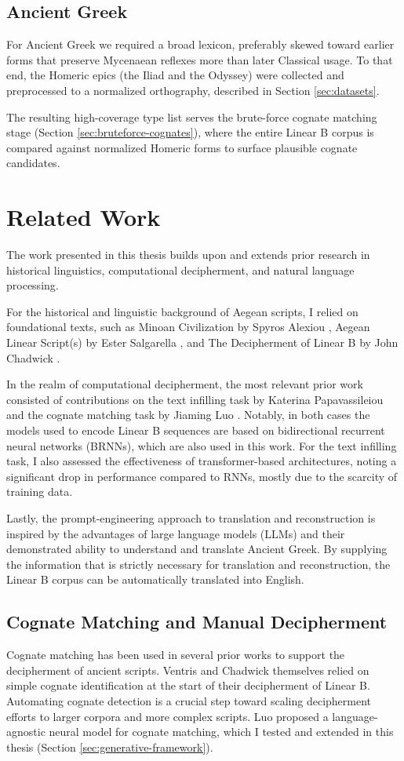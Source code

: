 \subsection{Ancient Greek}
For Ancient Greek we required a broad lexicon, preferably skewed toward earlier forms that preserve Mycenaean reflexes more than later Classical usage.
To that end, the Homeric epics (the Iliad and the Odyssey) were collected and preprocessed to a normalized orthography, described in Section \ref{sec:datasets}.

The resulting high-coverage type list serves the brute-force cognate matching stage (Section \ref{sec:bruteforce-cognates}), where the entire Linear B corpus is compared against normalized Homeric forms to surface plausible cognate candidates.

\section{Related Work}
The work presented in this thesis builds upon and extends prior research in historical linguistics, computational decipherment, and natural language processing.

For the historical and linguistic background of Aegean scripts, I relied on foundational texts, such as Minoan Civilization by Spyros Alexiou \cite{alexiou-ch2}, Aegean Linear Script(s) by Ester Salgarella \cite{salg-ch1}, and The Decipherment of Linear B by John Chadwick \cite{chad-ch2}.

In the realm of computational decipherment, the most relevant prior work consisted of contributions on the text infilling task by Katerina Papavassileiou \cite{brnn-paper} and the cognate matching task by Jiaming Luo \cite{luo}.  
Notably, in both cases the models used to encode Linear B sequences are based on bidirectional recurrent neural networks (BRNNs), which are also used in this work.  
For the text infilling task, I also assessed the effectiveness of transformer-based architectures, noting a significant drop in performance compared to RNNs, mostly due to the scarcity of training data. 

Lastly, the prompt-engineering approach to translation and reconstruction is inspired by the advantages of large language models (LLMs) and their demonstrated ability to understand and translate Ancient Greek.  
By supplying the information that is strictly necessary for translation and reconstruction, the Linear B corpus can be automatically translated into English.

\subsection{Cognate Matching and Manual Decipherment}
Cognate matching has been used in several prior works to support the decipherment of ancient scripts.  
Ventris and Chadwick themselves relied on simple cognate identification at the start of their decipherment of Linear B.  
Automating cognate detection is a crucial step toward scaling decipherment efforts to larger corpora and more complex scripts.  
Luo proposed a language-agnostic neural model for cognate matching, which I tested and extended in this thesis (Section \ref{sec:generative-framework}).


